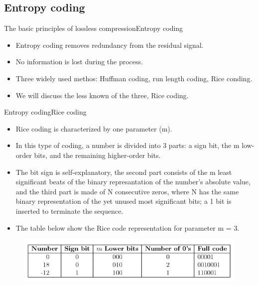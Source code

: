 \documentclass{beamer}
\begin{document}
\subsection{Entropy coding}
\begin{frame}{The basic principles of lossless compression}{Entropy coding}
	\begin{itemize}
		\item{
			Entropy coding removes redundancy from the residual signal.
		}
		\item{
			No information is lost during the process.
		}
		\item{
			Three widely used methos: Huffman coding, run length coding, Rice conding.
		}
		\item{
			We will discuss the less known of the three, Rice coding.
		}
	\end{itemize}
\end{frame}
\begin{frame}{Entropy coding}{Rice coding}
	\begin{itemize}
		\item{
			Rice coding is characterized by one parameter (m).
		}
		\item{
			In this type of coding, a number is divided into 3 parts: a sign bit, the m low-order bits, and the remaining higher-order bits.
		}
		\item{
			The bit sign is self-explanatory, the second part consists of the m least significant beats of the binary represantation of the number's absolute value, and the third part is made of N consecutive zeros, where N has the same binary representation of the yet unused most significant bits; a 1 bit is inserted to terminate the sequence.
		}
		\item{
			The table below show the Rice code representation for parameter m = 3.
		}
	\end{itemize}
	\begin{figure}
		\includegraphics[scale=0.42]{rice_coding.png}
	\end{figure}  
\end{frame}
\end{document}
